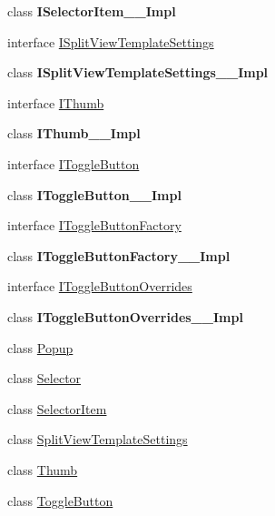 \begin{DoxyCompactItemize}
\item 
class {\bfseries I\+Selector\+Item\+\_\+\+\_\+\+Impl}
\item 
interface \hyperlink{interface_windows_1_1_u_i_1_1_xaml_1_1_controls_1_1_primitives_1_1_i_split_view_template_settings}{I\+Split\+View\+Template\+Settings}
\item 
class {\bfseries I\+Split\+View\+Template\+Settings\+\_\+\+\_\+\+Impl}
\item 
interface \hyperlink{interface_windows_1_1_u_i_1_1_xaml_1_1_controls_1_1_primitives_1_1_i_thumb}{I\+Thumb}
\item 
class {\bfseries I\+Thumb\+\_\+\+\_\+\+Impl}
\item 
interface \hyperlink{interface_windows_1_1_u_i_1_1_xaml_1_1_controls_1_1_primitives_1_1_i_toggle_button}{I\+Toggle\+Button}
\item 
class {\bfseries I\+Toggle\+Button\+\_\+\+\_\+\+Impl}
\item 
interface \hyperlink{interface_windows_1_1_u_i_1_1_xaml_1_1_controls_1_1_primitives_1_1_i_toggle_button_factory}{I\+Toggle\+Button\+Factory}
\item 
class {\bfseries I\+Toggle\+Button\+Factory\+\_\+\+\_\+\+Impl}
\item 
interface \hyperlink{interface_windows_1_1_u_i_1_1_xaml_1_1_controls_1_1_primitives_1_1_i_toggle_button_overrides}{I\+Toggle\+Button\+Overrides}
\item 
class {\bfseries I\+Toggle\+Button\+Overrides\+\_\+\+\_\+\+Impl}
\item 
class \hyperlink{class_windows_1_1_u_i_1_1_xaml_1_1_controls_1_1_primitives_1_1_popup}{Popup}
\item 
class \hyperlink{class_windows_1_1_u_i_1_1_xaml_1_1_controls_1_1_primitives_1_1_selector}{Selector}
\item 
class \hyperlink{class_windows_1_1_u_i_1_1_xaml_1_1_controls_1_1_primitives_1_1_selector_item}{Selector\+Item}
\item 
class \hyperlink{class_windows_1_1_u_i_1_1_xaml_1_1_controls_1_1_primitives_1_1_split_view_template_settings}{Split\+View\+Template\+Settings}
\item 
class \hyperlink{class_windows_1_1_u_i_1_1_xaml_1_1_controls_1_1_primitives_1_1_thumb}{Thumb}
\item 
class \hyperlink{class_windows_1_1_u_i_1_1_xaml_1_1_controls_1_1_primitives_1_1_toggle_button}{Toggle\+Button}
\end{DoxyCompactItemize}
